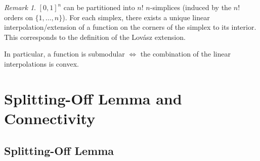 \documentclass[11pt, a4paper]{article}
\newcommand{\set}[1]{\{#1\}}
\theoremstyle{remark}
\newtheorem*{uremark}{Remark}
\theoremstyle{definition}
\begin{document}
\begin{uremark}
	$[0,1]^n$ can be partitioned into $n!$ $n$-simplices (induced by the $n!$
	orders on $\set{1,\ldots,n}$). For each simplex, there exists a unique
	linear interpolation/extension of a function on the corners of the simplex to
	its interior. This corresponds to the definition of the Lovász extension.

	In particular, a function is submodular $\Leftrightarrow$ the combination
	of the linear interpolations is convex.
\end{uremark}


\section{Splitting-Off Lemma and Connectivity}
\subsection{Splitting-Off Lemma}
\end{document}
